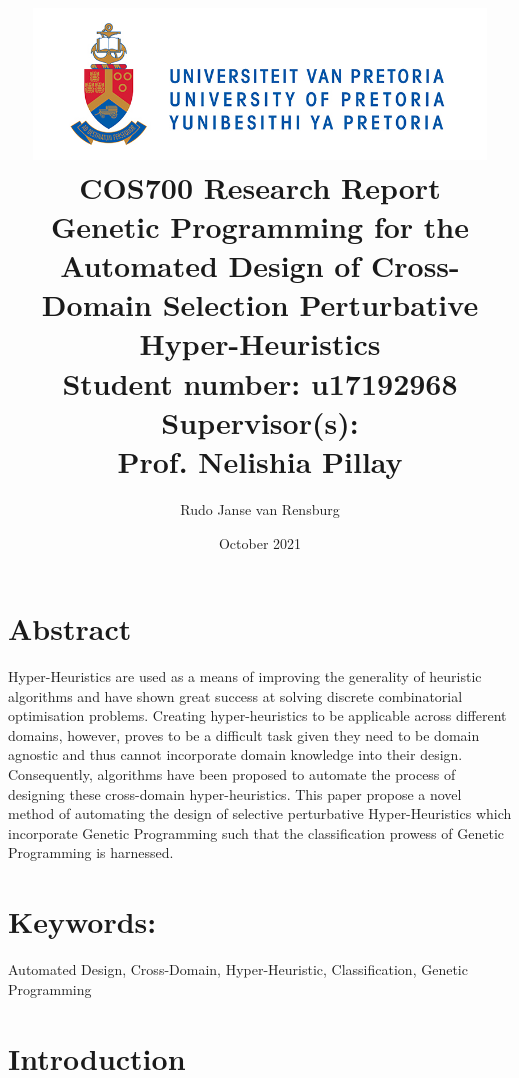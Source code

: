 \documentclass[a4paper,12pt]{article}
\title
{
   \includegraphics[width=12cm]{up-logo.jpg} \\
   \vspace{2cm}
   \textbf{COS700 Research Report} \\ \vspace{0.5cm}
   \textbf{Genetic Programming for the Automated Design of Cross-Domain Selection Perturbative Hyper-Heuristics } \\ \vspace{0.5cm}
   \textbf{Student number:} u17192968 \\ \vspace{0.5cm}
   \textbf{Supervisor(s)}: \\ Prof. Nelishia Pillay  
}
\author{Rudo Janse van Rensburg}
\date{October 2021}
\begin{document}
\maketitle

\newpage
\linespread{1.241}
\tableofcontents
\newpage
\section*{Abstract}
    \par{
        \noindent 
        Hyper-Heuristics are used as a means of improving the generality of heuristic
        algorithms and have shown great success at solving discrete combinatorial 
        optimisation problems. Creating hyper-heuristics to be applicable across different
        domains, however, proves to be a difficult task given they need to be domain
        agnostic and thus cannot incorporate domain knowledge into their design. Consequently, 
        algorithms have been proposed to automate the process of designing
        these cross-domain hyper-heuristics. This paper propose a novel method of automating 
        the design of selective perturbative Hyper-Heuristics which incorporate Genetic Programming
        such that the classification prowess of Genetic Programming is harnessed.
    }

\section*{Keywords:}
    \par{Automated Design, Cross-Domain, Hyper-Heuristic, Classification, Genetic Programming}

\newpage
\section{Introduction}
\end{document}
